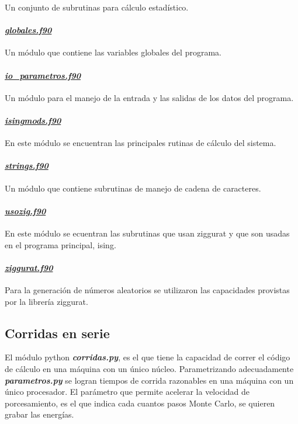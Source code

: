 Un conjunto de subrutinas para c\'alculo estad\'istico. 

\paragraph{\underline{\textit{globales.f90}}}
Un m\'odulo que contiene las variables globales del programa.
	
\paragraph{\underline{\textit{io\_parametros.f90}}}  
Un m\'odulo para el manejo de la entrada y las salidas de los
datos del programa.


\paragraph{\underline{\textit{isingmods.f90}}} 
En este m\'odulo  se encuentran las principales rutinas de c\'alculo del
sistema.


\paragraph{\underline{\textit{strings.f90}}}
Un m\'odulo que contiene subrutinas de manejo de cadena de caracteres.


\paragraph{\underline{\textit{usozig.f90}}} 
En este m\'odulo se ecuentran las subrutinas que usan ziggurat y que
son usadas en el programa principal, ising.
					
					
\paragraph{\underline{\textit{ziggurat.f90}}}

Para la generaci\'on de n\'umeros aleatorios se utilizaron
las capacidades provistas por la librer\'ia ziggurat. 


\subsection{Corridas en serie}\label{serie}
El módulo python \textbf{\textit{corridas.py}}, es el que tiene la capacidad de correr
el código de cálculo en una máquina con un único núcleo. Parametrizando adecuadamente
\textbf{\textit{parametros.py}} se logran tiempos de corrida razonables en una máquina
con un único procesador. El parámetro que permite acelerar la velocidad de porcesamiento, 
es el que indica cada cuantos pasos Monte Carlo, se quieren grabar las energías.

